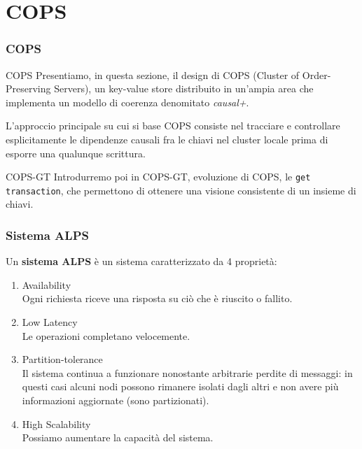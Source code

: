 \section{COPS}
\begin{frame}
\frametitle{COPS}
\begin{block}{COPS}
Presentiamo, in questa sezione, il design di COPS (Cluster of Order-Preserving Servers),
un key-value store distribuito in un'ampia area che implementa un modello di coerenza
denomitato \textit{causal+}.
\end{block}
L'approccio principale su cui si base COPS consiste nel tracciare e controllare esplicitamente
le dipendenze causali fra le chiavi nel cluster locale prima di esporre una qualunque scrittura.
\begin{block}{COPS-GT}
Introdurremo poi in COPS-GT, evoluzione di COPS, le \texttt{get transaction}, che permettono
di ottenere una visione consistente di un insieme di chiavi.
\end{block}
\end{frame}

\begin{frame}
\frametitle{Sistema ALPS}
	\begin{definizione}
	Un \textbf{sistema ALPS} è un sistema caratterizzato da 4 proprietà:
	\begin{enumerate}
		\item<1-> Availability \\
				  Ogni richiesta riceve una risposta su ciò che è riuscito o fallito.
		\item<1-> Low Latency \\
				  Le operazioni completano velocemente.
		\item<1-> Partition-tolerance \\
				  Il sistema continua a funzionare nonostante arbitrarie perdite di messaggi:
				  in questi casi alcuni nodi possono rimanere isolati dagli altri e non avere
				  più informazioni aggiornate (sono partizionati).
		\item<1-> High Scalability \\
				  Possiamo aumentare la capacità del sistema.
	\end{enumerate}
	\end{definizione}
\end{frame}

